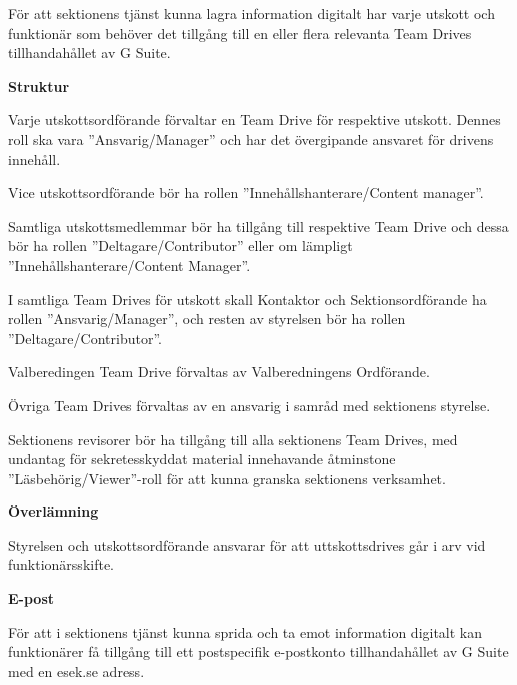 \documentclass[../_main/handlingar.tex]{subfiles}
\begin{document}
    För att sektionens tjänst kunna lagra information digitalt har varje utskott och funktionär som behöver det tillgång till en eller flera relevanta Team Drives tillhandahållet av G Suite. 

    \textbf{Struktur}
    \begin{dashlist}

    \item Varje utskottsordförande förvaltar en Team Drive för respektive utskott. Dennes roll ska vara ''Ansvarig/Manager'' och har det övergipande ansvaret för drivens innehåll. 
    
    \item Vice utskottsordförande bör ha rollen ''Innehållshanterare/Content manager''. 

    \item Samtliga utskottsmedlemmar bör ha tillgång till respektive Team Drive och dessa bör ha rollen ''Deltagare/Contributor'' eller om lämpligt ''Innehållshanterare/Content Manager''. 
    
    \item I samtliga Team Drives för utskott skall Kontaktor och Sektionsordförande ha rollen ''Ansvarig/Manager'', och resten av styrelsen bör ha rollen ''Deltagare/Contributor''.
    
    \item Valberedingen Team Drive förvaltas av Valberedningens Ordförande.
    
    \item Övriga Team Drives förvaltas av en ansvarig i samråd med sektionens styrelse. 

    \item Sektionens revisorer bör ha tillgång till alla sektionens Team Drives, med undantag för sekretesskyddat material innehavande åtminstone ''Läsbehörig/Viewer''-roll för att kunna granska sektionens verksamhet. 
     
    \end{dashlist}
    
    \vspace{4px}
    \textbf{Överlämning}

    Styrelsen och utskottsordförande ansvarar för att uttskottsdrives går i arv vid funktionärsskifte.

    \vspace{10px}
    {\Large \textbf{E-post}}
    \vspace{6px}

    För att i sektionens tjänst kunna sprida och ta emot information digitalt kan funktionärer få tillgång till ett postspecifik e-postkonto tillhandahållet av G Suite med en esek.se adress. 
\end{document}
